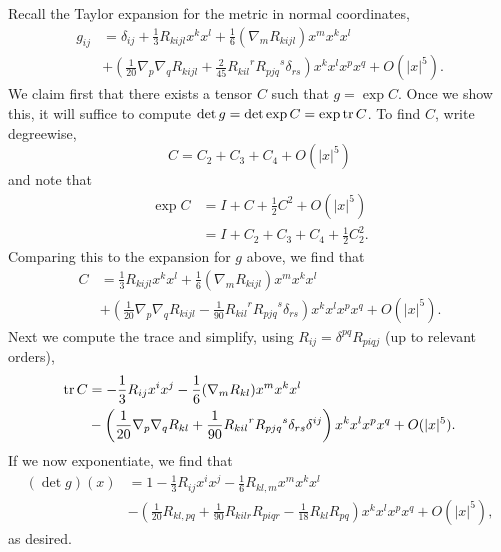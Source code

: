 \documentclass{../mathnotes}
\begin{document}
Recall the Taylor expansion for the metric in normal coordinates,
\begin{align*}
    g_{ij} &= \delta_{ij} + \frac{1}{3}R_{kijl}x^kx^l+\frac{1}{6}\left( \nabla_mR_{kijl} \right)x^mx^kx^l\\
    &+\left(\frac{1}{20}\nabla_p\nabla_qR_{kijl}+\frac{2}{45}{R_{kil}}^r{R_{pjq}}^s\delta_{rs}  \right)x^kx^lx^px^q + O(|x|^5).
\end{align*}
We claim first that there exists a tensor $C$ such that $g=\exp C$. Once we
show this, it will suffice to compute $\det g=\det\exp C=\exp\operatorname{tr} C$. To find $C$, write
degreewise,
\[C = C_2 + C_3 + C_4 + O(|x|^5)\]
and note that
\begin{align*}
    \exp C &= I + C + \frac{1}{2}C^2 + O(|x|^5)\\
    &= I + C_2 + C_3 + C_4 + \frac{1}{2}C_2^2.
\end{align*}
Comparing this to the expansion for $g$ above, we find that
\begin{align*}
    C &= \frac{1}{3}R_{kijl}x^kx^l+\frac{1}{6}(\nabla_mR_{kijl})x^mx^kx^l\\
    &+ \left( \frac{1}{20}\nabla_p\nabla_qR_{kijl} - \frac{1}{90}{R_{kil}}^r{R_{pjq}}^s\delta_{rs}\right)x^kx^lx^px^q+O(|x|^5).
\end{align*}
Next we compute the trace and simplify, using $R_{ij}=\delta^{pq}R_{piqj}$ (up to relevant orders),
\begin{align*}
    \operatorname{tr} C &= -\frac{1}{3} R_{ij}x^ix^j - \frac{1}{6}(\nabla_m R_{kl})x^mx^kx^l\\
    &-\left( \frac{1}{20}\nabla_p\nabla_qR_{kl} +\frac{1}{90}{R_{kil}}^r{R_{pjq}}^s\delta_{rs}\delta^{ij}\right)x^kx^lx^px^q+O(|x|^5).
\end{align*}
If we now exponentiate, we find that
\begin{align*}
    (\det g)(x) &= 1-\frac{1}{3}R_{ij}x^ix^j-\frac{1}{6}R_{kl,m}x^mx^kx^l\\
    &-\left( \frac{1}{20}R_{kl,pq}+\frac{1}{90}{R_{kilr}}{R_{piqr}}-\frac{1}{18}R_{kl}R_{pq}\right)x^kx^lx^px^q+O(|x|^5),
\end{align*}
as desired.
\end{document}
